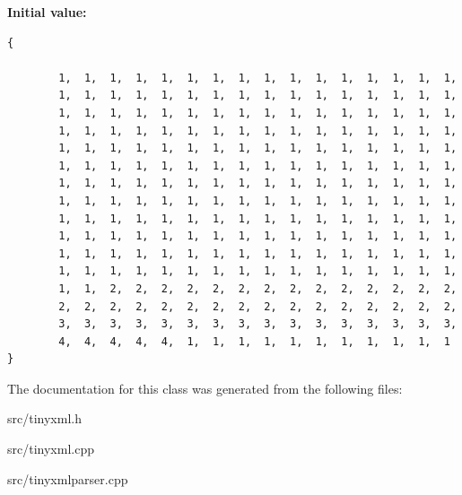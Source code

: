 {\bf Initial value:}

\footnotesize\begin{verbatim} 
{
    
        1,  1,  1,  1,  1,  1,  1,  1,  1,  1,  1,  1,  1,  1,  1,  1,  
        1,  1,  1,  1,  1,  1,  1,  1,  1,  1,  1,  1,  1,  1,  1,  1,  
        1,  1,  1,  1,  1,  1,  1,  1,  1,  1,  1,  1,  1,  1,  1,  1,  
        1,  1,  1,  1,  1,  1,  1,  1,  1,  1,  1,  1,  1,  1,  1,  1,  
        1,  1,  1,  1,  1,  1,  1,  1,  1,  1,  1,  1,  1,  1,  1,  1,  
        1,  1,  1,  1,  1,  1,  1,  1,  1,  1,  1,  1,  1,  1,  1,  1,  
        1,  1,  1,  1,  1,  1,  1,  1,  1,  1,  1,  1,  1,  1,  1,  1,  
        1,  1,  1,  1,  1,  1,  1,  1,  1,  1,  1,  1,  1,  1,  1,  1,  
        1,  1,  1,  1,  1,  1,  1,  1,  1,  1,  1,  1,  1,  1,  1,  1,  
        1,  1,  1,  1,  1,  1,  1,  1,  1,  1,  1,  1,  1,  1,  1,  1,  
        1,  1,  1,  1,  1,  1,  1,  1,  1,  1,  1,  1,  1,  1,  1,  1,  
        1,  1,  1,  1,  1,  1,  1,  1,  1,  1,  1,  1,  1,  1,  1,  1,  
        1,  1,  2,  2,  2,  2,  2,  2,  2,  2,  2,  2,  2,  2,  2,  2,  
        2,  2,  2,  2,  2,  2,  2,  2,  2,  2,  2,  2,  2,  2,  2,  2,  
        3,  3,  3,  3,  3,  3,  3,  3,  3,  3,  3,  3,  3,  3,  3,  3,  
        4,  4,  4,  4,  4,  1,  1,  1,  1,  1,  1,  1,  1,  1,  1,  1   
}
\end{verbatim}\normalsize 


The documentation for this class was generated from the following files:\begin{CompactItemize}
\item 
src/tinyxml.h\item 
src/tinyxml.cpp\item 
src/tinyxmlparser.cpp\end{CompactItemize}
